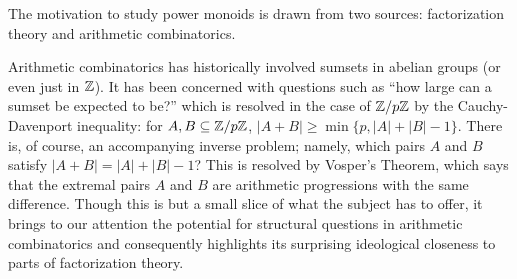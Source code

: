 

The motivation to study power monoids is drawn from two sources: factorization theory and arithmetic combinatorics.

Arithmetic combinatorics has historically involved sumsets in abelian groups (or even just in $\mathbb{Z}$).
It has been concerned with questions such as ``how large can a sumset be expected to be?'' which is resolved in the case of $\mathbb{Z}/p\mathbb{Z}$ by the Cauchy-Davenport inequality: for $A,B\subseteq \mathbb{Z}/p\mathbb{Z}$, $|A+B| \ge \min\{p,|A| + |B| -1\}$. 
There is, of course, an accompanying inverse problem; namely, which pairs $A$ and $B$ satisfy $|A+B| = |A|+|B|-1$?
This is resolved by Vosper's Theorem, which says that the extremal pairs $A$ and $B$ are arithmetic progressions with the same difference.
Though this is but a small slice of what the subject has to offer, it brings to our attention the potential for structural questions in arithmetic combinatorics and consequently highlights its surprising ideological closeness to parts of factorization theory.  

